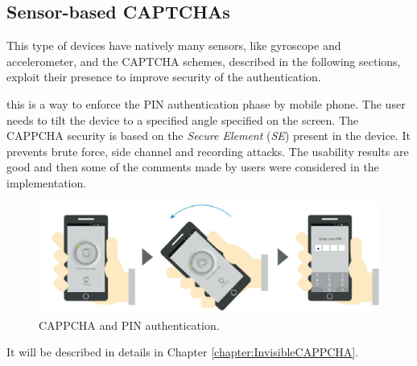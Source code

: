 \subsection{Sensor-based CAPTCHAs}
This type of devices have natively many sensors, like gyroscope and accelerometer, and the CAPTCHA schemes, described in the following sections, exploit their presence to improve security of the authentication.
\begin{itemize}
{this is a way to enforce the PIN authentication phase by mobile phone\cite{CAPPCHA}. The user needs to tilt the device to a specified angle specified on the screen. The CAPPCHA security is based on the \textit{Secure Element} (\textit{SE}) present in the device. It prevents brute force, side channel and recording attacks. The usability results are good and then some of the comments made by users were considered in the implementation.
\begin{figure}[h]
     \centering
     \includegraphics[width=.8\linewidth]{Images/StateOfArt/CAPPCHA}
     \caption{\footnotesize{CAPPCHA and PIN authentication\cite{CAPPCHA}.}}\label{soa:interactive_CAPTCHA}
\end{figure}
}
{It will be described in details in Chapter \ref{chapter:InvisibleCAPPCHA}.}
\end{itemize}

